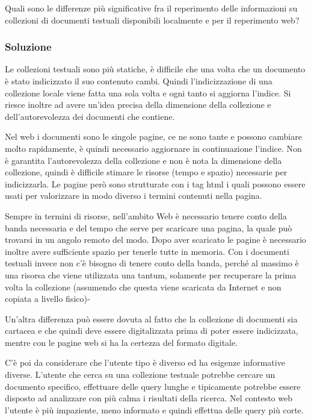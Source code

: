 Quali sono le differenze più significative fra il reperimento delle informazioni su collezioni di documenti testuali disponibili localmente e per il reperimento web?

\subsubsection{Soluzione}

Le collezioni testuali sono più statiche, è difficile che una volta che un documento è stato indicizzato il suo contenuto cambi. Quindi l'indicizzazione di una collezione locale viene fatta una sola volta e ogni tanto si aggiorna l'indice. 
Si riesce inoltre ad avere un'idea precisa della dimensione della collezione e dell'autorevolezza dei documenti che contiene. 

Nel web i documenti sono le singole pagine, ce ne sono tante e possono cambiare molto rapidamente, è quindi necessario aggiornare in continuazione l'indice. Non è garantita l'autorevolezza della collezione e non è nota la dimensione della collezione, quindi è difficile stimare le risorse (tempo e spazio) necessarie per indicizzarla. Le pagine però sono strutturate con i tag html i quali possono essere usati per valorizzare in modo diverso i termini contenuti nella pagina.

Sempre in termini di risorse, nell'ambito Web è necessario tenere conto della banda necessaria e del tempo che serve per scaricare una pagina, la quale può trovarsi in un angolo remoto del modo. Dopo aver scaricato le pagine è necessario inoltre avere sufficiente spazio per tenerle tutte in memoria. Con i documenti testuali invece non c'è bisogno di tenere conto della banda, perché al massimo è una risorsa che viene utilizzata una tantum, solamente per recuperare la prima volta la collezione (assumendo che questa viene scaricata da Internet e non copiata a livello fisico)-

Un'altra differenza può essere dovuta al fatto che la collezione di documenti sia cartacea e che quindi deve essere digitalizzata prima di poter essere indicizzata, mentre con le pagine web si ha la certezza del formato digitale.

C'è poi da considerare che l'utente tipo è diverso ed ha esigenze informative diverse. L'utente che cerca su una collezione testuale potrebbe cercare un documento specifico, effettuare delle query lunghe e tipicamente potrebbe essere disposto ad analizzare con più calma i risultati della ricerca. Nel contesto web l'utente è più impaziente, meno informato e quindi effettua delle query più corte.

